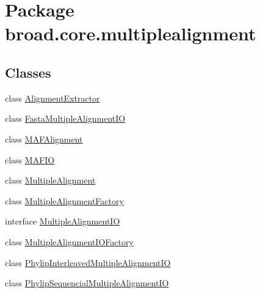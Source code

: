 \hypertarget{namespacebroad_1_1core_1_1multiplealignment}{\section{Package broad.\+core.\+multiplealignment}
\label{namespacebroad_1_1core_1_1multiplealignment}
}
\subsection*{Classes}
\begin{DoxyCompactItemize}
\item 
class \hyperlink{classbroad_1_1core_1_1multiplealignment_1_1_alignment_extractor}{Alignment\+Extractor}
\item 
class \hyperlink{classbroad_1_1core_1_1multiplealignment_1_1_fasta_multiple_alignment_i_o}{Fasta\+Multiple\+Alignment\+I\+O}
\item 
class \hyperlink{classbroad_1_1core_1_1multiplealignment_1_1_m_a_f_alignment}{M\+A\+F\+Alignment}
\item 
class \hyperlink{classbroad_1_1core_1_1multiplealignment_1_1_m_a_f_i_o}{M\+A\+F\+I\+O}
\item 
class \hyperlink{classbroad_1_1core_1_1multiplealignment_1_1_multiple_alignment}{Multiple\+Alignment}
\item 
class \hyperlink{classbroad_1_1core_1_1multiplealignment_1_1_multiple_alignment_factory}{Multiple\+Alignment\+Factory}
\item 
interface \hyperlink{interfacebroad_1_1core_1_1multiplealignment_1_1_multiple_alignment_i_o}{Multiple\+Alignment\+I\+O}
\item 
class \hyperlink{classbroad_1_1core_1_1multiplealignment_1_1_multiple_alignment_i_o_factory}{Multiple\+Alignment\+I\+O\+Factory}
\item 
class \hyperlink{classbroad_1_1core_1_1multiplealignment_1_1_phylip_interleaved_multiple_alignment_i_o}{Phylip\+Interleaved\+Multiple\+Alignment\+I\+O}
\item 
class \hyperlink{classbroad_1_1core_1_1multiplealignment_1_1_phylip_sequencial_multiple_alignment_i_o}{Phylip\+Sequencial\+Multiple\+Alignment\+I\+O}
\end{DoxyCompactItemize}
